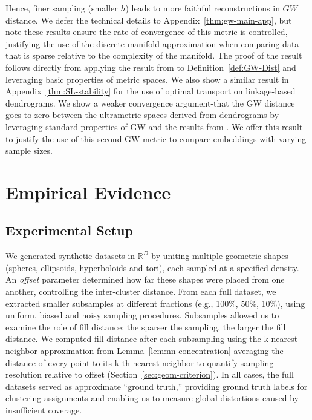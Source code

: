 \documentclass{article}
\theoremstyle{plain}
\theoremstyle{definition}
\theoremstyle{remark}
\begin{document}
Hence, finer sampling (smaller $h$) leads to more faithful reconstructions in $GW$ distance. We defer the technical details to Appendix~\ref{thm:gw-main-app}, but note these results ensure the rate of convergence of this metric is controlled, justifying the use of the discrete manifold approximation when comparing data that is sparse relative to the complexity of the manifold. The proof of the result follows directly from applying the result from \citet{soberApproximatingRiemannianMetric2020} to Definition~\ref{def:GW-Dist} and leveraging basic properties of metric spaces. We also show a similar result in Appendix~\ref{thm:SL-stability} for the use of optimal transport on linkage-based dendrograms. We show a weaker convergence argument-that the GW distance goes to zero between the ultrametric spaces derived from dendrograms-by leveraging standard properties of GW and the results from \citet{chaudhuriConsistentProceduresCluster2014}. We offer this result to justify the use of this second GW metric to compare embeddings with varying sample sizes.


\section{Empirical Evidence}
\label{sec:Empirical Evidence}

\subsection{Experimental Setup}
\label{sec:methodology-setup}

We generated synthetic datasets in $\mathbb{R}^D$ by uniting multiple geometric shapes (spheres, ellipsoids, hyperboloids and tori), each sampled at a specified density. An \emph{offset} parameter determined how far these shapes were placed from one another, controlling the inter-cluster distance. From each full dataset, we extracted smaller subsamples at different fractions (e.g., 100\%, 50\%, 10\%), using uniform, biased and noisy sampling procedures. Subsamples allowed us to examine the role of fill distance: the sparser the sampling, the larger the fill distance. We computed fill distance after each subsampling using the k-nearest neighbor approximation from Lemma~\ref{lem:nn-concentration}-averaging the distance of every point to its k-th nearest neighbor-to quantify sampling resolution relative to offset (Section~\ref{sec:geom-criterion}). In all cases, the full datasets served as approximate “ground truth,” providing ground truth labels for clustering assignments and enabling us to measure global distortions caused by insufficient coverage. 
\end{document}
